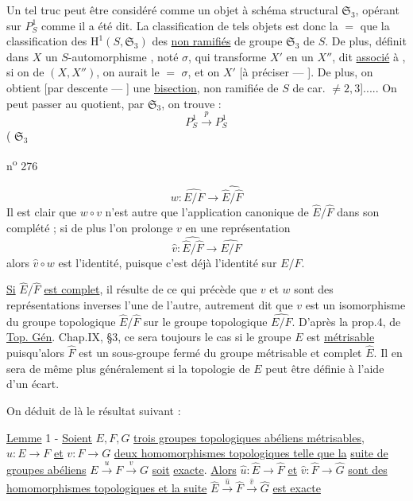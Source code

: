 Un tel truc peut être considéré comme un objet à schéma structural $\mathfrak S_3$, opérant sur $P^1_S$ comme il a été dit. La classification de tels objets est donc la $=$ que la classification des  $\mathrm H^1(S,\mathfrak S_3)$ des   \uline{non ramifiés} de  groupe $\mathfrak S_3$ de $S$. De plus,  définit dans $X$ un $S$-automorphisme , noté $\sigma$, qui transforme $X'$ en un $X''$, dit \uline{associé} à  , si on  de $(X,X'')$, on aurait le $=$ $\sigma$, et on  $X'$ [à préciser --- ]. De plus, on obtient [par descente --- ] une \uline{bisection}, non ramifiée \deleted{[\unsure{du moins}}  de $S$ de car. $\ne 2,3$]..... On peut passer au quotient,  par $\mathfrak S_3$,  on trouve  :
\[
P^1_S\xrightarrow{p}P^1_S
\]
( $\mathfrak S_3$ 

n\textsuperscript{o} 276

\[
w:\widehat{E/F}\longrightarrow\widehat{\hat E/\hat F}
\]
Il est clair que $w\circ v$ n'est autre que l'application canonique de $\hat E/\hat F$ dans son complété ; si de plus l'on prolonge $v$ en une représentation
\[
\hat v:\widehat{\hat E/\hat F}\longrightarrow\widehat{E/F}
\]
alors $\hat v\circ w$ est l'identité, puisque c'est déjà l'identité sur $E/F$.

\uline{Si} $\hat E/\hat F$ \uline{est complet}, il résulte de ce qui précède que $v$ et $w$ sont des représentations inverses l'une de l'autre, autrement dit que $v$ est un isomorphisme du groupe topologique $\hat E/\hat F$ sur le groupe topologique $\widehat{E/F}$. D'après la prop.4, de \uline{Top. Gén}. Chap.IX, \S3, ce sera toujours le cas si le groupe $E$ est \uline{métrisable} puisqu'alors $\hat F$ est un sous-groupe fermé du groupe métrisable et complet $\hat E$. Il en sera de même plus généralement si la topologie de $E$ peut être définie à l'aide d'un écart.

On déduit de là le résultat suivant :

\uline{Lemme} 1 - \uline{Soient} $E,F,G$ \uline{trois groupes topologiques abéliens métrisables}, $u:E\longrightarrow F$ \uline{et} $v:F\longrightarrow G$ \uline{deux homomorphismes topologiques telle que la}
\uline{suite de groupes abéliens} $E\xrightarrow{u}F\xrightarrow{v}G$ \uline{soit} \uline{exacte}. \uline{Alors} $\hat u:\hat E\to\hat F$ \uline{et} $\hat v:\hat F\longrightarrow\hat G$ \uline{sont des homomorphismes topologiques et la suite} $\hat E\xrightarrow{\hat u}\hat F\xrightarrow{\hat v}\hat G$ \uline{est exacte}


